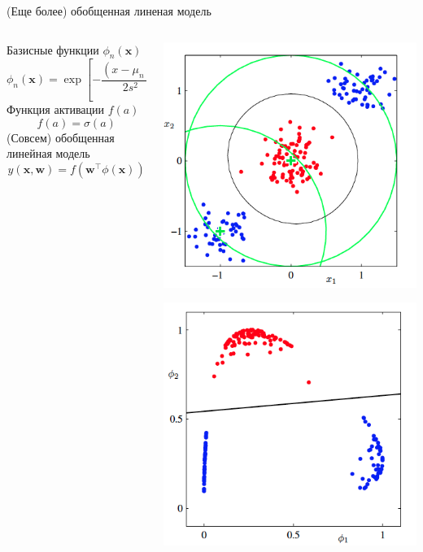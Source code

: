 \documentclass[10pt]{beamer}
\begin{document}
\begin{frame}{(Еще более) обобщенная линеная модель}

\begin{columns}[T]
    \begin{column}{.5\textwidth}
    \vspace{2em}
	Базисные функции $\phi_n(\mathbf{x})$
\[
\phi_n(\mathbf{x}) = \exp\left[ -\frac{(x - \mu_n)^2}{2 s^2}\right]
\]
Функция активации $f(a)$
\[
f(a) = \sigma(a)
\]
(Совсем) обобщенная линейная модель
\[
y(\mathbf{x}, \mathbf{w}) = f(\mathbf{w}^\top \phi(\mathbf{x}))
\]

    \end{column}
       
    \begin{column}{.5\textwidth}
    \vspace{-2em}
	\begin{center}
   		\includegraphics[scale=0.25]{images/nl.png}
   		
   		\includegraphics[scale=0.25]{images/l.png}
    \end{center}
    \end{column}
  \end{columns}


\end{frame}
\end{document}
